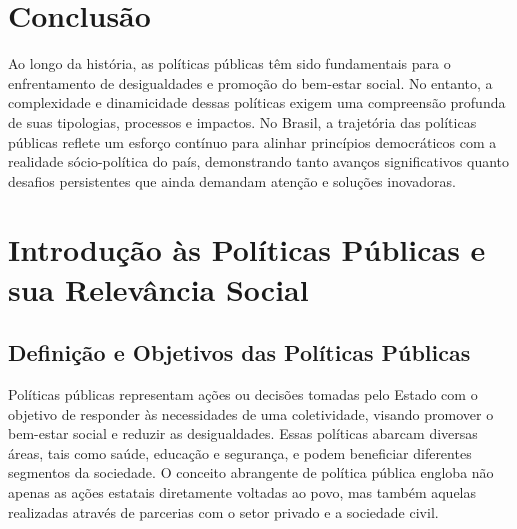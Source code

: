 \documentclass[
   article,       
   12pt,          
   oneside,       
   a4paper,       
   english,       
   brazil,        
   sumario=tradicional
   ]{abntex2}
\begin{document}
\section{Conclusão}
Ao longo da história, as políticas públicas têm sido fundamentais para o enfrentamento de desigualdades e promoção do bem-estar social. No entanto, a complexidade e dinamicidade dessas políticas exigem uma compreensão profunda de suas tipologias, processos e impactos. No Brasil, a trajetória das políticas públicas reflete um esforço contínuo para alinhar princípios democráticos com a realidade sócio-política do país, demonstrando tanto avanços significativos quanto desafios persistentes que ainda demandam atenção e soluções inovadoras.

\cite{A_CAUSA_E_AS_POLITICAS_DE_DIREITOS_HUMANOS_NO}
\cite{Ciclo_de_Politicas_Publicas_por_que_e_importa}
\cite{Conheca_o_ciclo_das_politicas_publicas__Polit}
\cite{Educacao_Inclusiva_Conheca_o_historico_da_leg}
\cite{Em_Buenos_Aires_Silvio_Almeida_defende_a_inst}
\cite{Entendendo_a_Tipologia_de_Politicas_Publicas_}
\cite{Escola_Nacional_de_Administracao_Publica__Wik}
\cite{Especialista_em_politicas_publicas_e_gestao_g}
\cite{FEDERALISMO_E_POLITICAS_PUBLICAS_NO_BRASIL_Ho}
\cite{Institucionalizacao_das_politicas_em_Direitos}
\cite{Ministerio_do_Planejamento_e_Orcamento__Wikip}
\cite{Ministro_defende_que_direitos_humanos_precisa}
\cite{Politica_conceito_politicas_publicas_e_partid}
\cite{Politica_publica__o_que_e_tipos_de_politicas_}
\cite{Politica_publica__Wikipedia_a_enciclopedia_li}
\cite{Politicas_publicas__Wikipedia_la_enciclopedia}
\cite{Politicas_Publicas_entenda_o_que_sao_para_que}
\cite{Politicas_Publicas_o_que_sao_e_para_que_serve}
\cite{Politicas_publicas_o_que_sao_e_para_que_serve}
\cite{Politicas_publicas_o_que_sao_quem_faz_e_tipos}
\cite{Politicas_publicas_o_que_sao_tipos_e_exemplos}
\cite{Revista_USP_119__Dossie_1_Democracia_e_politi}
\cite{TCU_Ciclo_das_politicas_publicas__Tudo_o_que_}
\section{Introdução às Políticas Públicas e sua Relevância Social}
\subsection{Definição e Objetivos das Políticas Públicas}
Políticas públicas representam ações ou decisões tomadas pelo Estado com o objetivo de responder às necessidades de uma coletividade, visando promover o bem-estar social e reduzir as desigualdades. Essas políticas abarcam diversas áreas, tais como saúde, educação e segurança, e podem beneficiar diferentes segmentos da sociedade. O conceito abrangente de política pública engloba não apenas as ações estatais diretamente voltadas ao povo, mas também aquelas realizadas através de parcerias com o setor privado e a sociedade civil.
\end{document}
